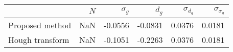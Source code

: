 \begin{tabular}{lrrrrr}
\toprule
{} &  $N$ &  $\sigma_g$ &   $d_g$ &  $\sigma_{d_g}$ &  $\sigma_{\sigma_g}$ \\
\midrule
Proposed method &  NaN &     -0.0556 & -0.0831 &          0.0376 &               0.0181 \\
Hough transform &  NaN &     -0.1051 & -0.2263 &          0.0376 &               0.0181 \\
\bottomrule
\end{tabular}
